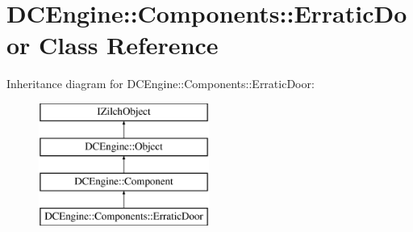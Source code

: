 \hypertarget{classDCEngine_1_1Components_1_1ErraticDoor}{\section{D\-C\-Engine\-:\-:Components\-:\-:Erratic\-Door Class Reference}
\label{classDCEngine_1_1Components_1_1ErraticDoor}
}
Inheritance diagram for D\-C\-Engine\-:\-:Components\-:\-:Erratic\-Door\-:\begin{figure}[H]
\begin{center}
\leavevmode
\includegraphics[height=4.000000cm]{classDCEngine_1_1Components_1_1ErraticDoor}
\end{center}
\end{figure}
